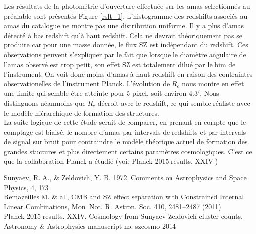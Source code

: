 \documentclass[a4paper,11pt]{article}
\begin{document}
Les résultats de la photométrie d'ouverture effectuée sur les amas
selectionnés au préalable sont présentés Figure
\ref{rslt_1}. L'histogramme des redshifts associés au amas du
catalogue ne montre pas une distribution uniforme. Il y a plus
d'amas détecté à bas redshift qu'à haut redshift. Cela ne devrait
théoriquement pas se produire car pour une masse donnée, le flux SZ
est indépendant du redshift. Ces observations peuvent s'expliquer par
le fait que lorsque le diamètre angulaire de l'amas observé est trop
petit, son effet SZ est totalement dilué par le bim de
l'instrument. On voit donc moins d'amas à haut redshift en raison des
contraintes observationelles de l'instrument Planck. L'évolution de
$R_c$ nous montre en effet une limite qui semble être atteinte pour $5$ pixel,
soit environ $4.3'$. Nous distinguons néanmoins que $R_c$ décroit avec
le redshift, ce qui semble réaliste avec le modèle hiérarchique de
formation des structures. \\

La suite logique de cette étude serait de comparer, en prenant en
compte que le comptage est biaisé, le nombre d'amas par intervals de
redshifts  et par intervals de signal sur bruit pour contraindre le modèle
théorique actuel de formation des grandes stuctures et plus
directement certains paramètres cosmologiques. C'est ce que la
collaboration Planck a étudié (voir Planck 2015
results. XXIV \cite{Planck_SZ}) 

\newpage
\begin{thebibliography}{2}

 Sunyaev, R. A., \& Zeldovich, Y. B. 1972, Comments on
  Astrophysics and Space Physics, 4, 173 \\
  
Remazeilles M. \& al., CMB and SZ effect
  separation with Constrained Internal Linear Combinations, 
  Mon. Not. R. Astron. Soc. 410, 2481–2487 (2011)  \\

 Planck 2015 results. XXIV. Cosmology from Sunyaev-Zeldovich
cluster counts, Astronomy \& Astrophysics manuscript no. szcosmo 2014
\end{thebibliography}

\end{document}
